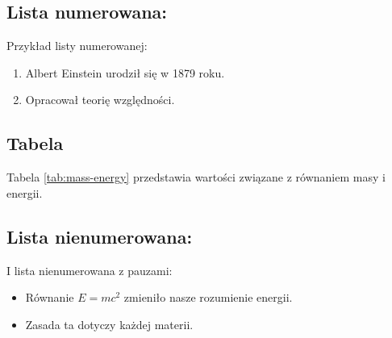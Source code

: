 \subsection{Lista numerowana:}
Przykład listy numerowanej:
\begin{enumerate}
    \item Albert Einstein urodził się w 1879 roku.
    \item Opracował teorię względności.
\end{enumerate}

\subsection{Tabela}
Tabela \ref{tab:mass-energy} przedstawia wartości związane z równaniem masy i energii.



\subsection{Lista nienumerowana:}
I lista nienumerowana z pauzami:
\begin{itemize}
    \renewcommand\labelitemi{--}
    \item Równanie \( E = mc^2 \) zmieniło nasze rozumienie energii.
    \item Zasada ta dotyczy każdej materii.
\end{itemize}